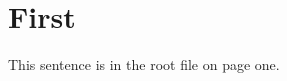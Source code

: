 \documentclass{article}
\begin{document}
\section{First}
This sentence is in the root file on page one.

\lipsum[1-7]

\end{document}
